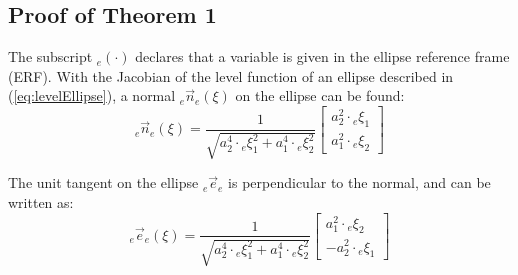 \appendix
\subsection{Proof of Theorem 1} \label{sec:proof1}


The subscript ${}_e (\cdot)$ declares that a variable is given in the ellipse reference frame (ERF).
With the Jacobian of the level function of an ellipse described in (\ref{eq:levelEllipse}), a normal ${}_e \vec n_e (\xi)$ on the ellipse can be found:
\begin{equation}
  {}_e \vec{n}_{e} (\xi) =
  \frac{1}{\sqrt{a_2^4 \cdot {}_e\xi_1^2 + a_1^4 \cdot{}_e \xi_2^2}}
  \begin{bmatrix}
    a_2^2 \cdot {}_e\xi_1 \\
    a_1^2 \cdot {}_e\xi_2
  \end{bmatrix}
\end{equation}

The unit tangent on the ellipse ${}_e\vec e_{e}$ is perpendicular to the normal, and can be written as:
\begin{equation}
  {}_e \vec{e}_{e} (\xi)=
  \frac{1}{\sqrt{a_2^4 \cdot {}_e\xi_1^2 + a_1^4 \cdot{}_e \xi_2^2}}
  \begin{bmatrix}
    a_1^2 \cdot {}_e\xi_2 \\
    - a_2^2 \cdot {}_e\xi_1
  \end{bmatrix}
\end{equation}

